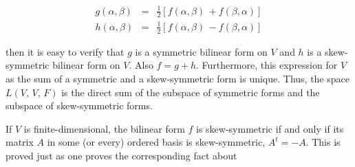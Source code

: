 \[\begin{array}{rcl}g(\alpha,\beta)&=&\frac{1}{2}[f(\alpha,\beta)\,+f(\beta, \alpha)]\\ h(\alpha,\beta)&=&\frac{1}{2}[f(\alpha,\beta)\,-f(\beta,\alpha)]\end{array}\]

then it is easy to verify that \(g\) is a symmetric bilinear form on \(V\) and \(h\) is a skew-symmetric bilinear form on \(V\). Also \(f=g+h\). Furthermore, this expression for \(V\) as the sum of a symmetric and a skew-symmetric form is unique. Thus, the space \(L(V,\,V,\,F)\) is the direct sum of the subspace of symmetric forms and the subspace of skew-symmetric forms.

If \(V\) is finite-dimensional, the bilinear form \(f\) is skew-symmetric if and only if its matrix \(A\) in some (or every) ordered basis is skew-symmetric, \(A^{t}=-A\). This is proved just as one proves the corresponding fact about